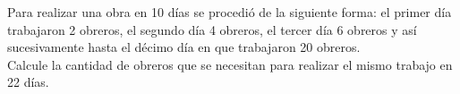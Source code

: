 \noindent
Para realizar una obra en 10 días se procedió de la siguiente forma: el primer día trabajaron 2 obreros, el segundo día 4 obreros, el tercer día 6 obreros y así sucesivamente hasta el décimo día en que trabajaron 20 obreros. \\
Calcule la cantidad de obreros que se necesitan para realizar el mismo trabajo en 22 días.
